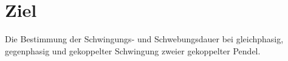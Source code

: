 \section{Ziel}
\label{sec:ziel}

Die Bestimmung der Schwingungs- und Schwebungsdauer bei gleichphasig, gegenphasig und gekoppelter Schwingung zweier gekoppelter Pendel.